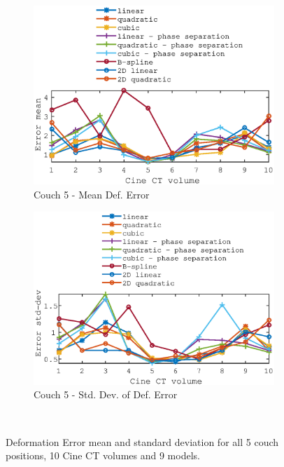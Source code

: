 \documentclass[11pt,a4paper,oneside]{report}
\begin{document}
\begin{figure}[H]
\begin{subfigure}[b]{0.5\textwidth}
    \includegraphics[width=\textwidth, trim=0 0 0 \trimval,clip=true]{figures/task4/def_mean_error_couch5.eps}
    \caption{Couch 5 - Mean Def. Error}
  \end{subfigure}%
  \begin{subfigure}[b]{0.5\textwidth}
    \includegraphics[width=\textwidth, trim=0 0 0 \trimval,clip=true]{figures/task4/def_stddev_error_couch5.eps}
    \caption{Couch 5 - Std. Dev. of Def. Error}
  \end{subfigure}
  ~
  \caption{Deformation Error mean and standard deviation for all 5 couch positions, 10 Cine CT volumes and 9 models.}
  \label{fig:c4defError}
  
\end{figure}
\end{document}
